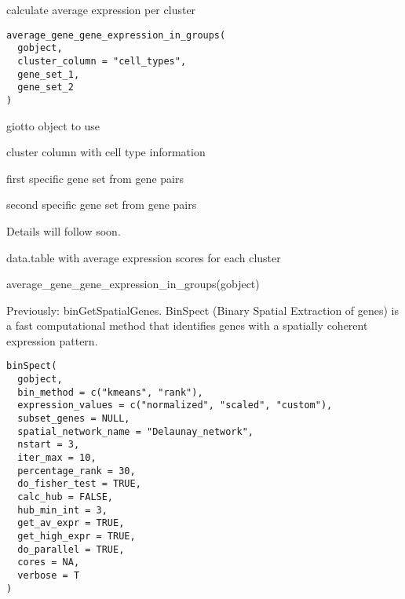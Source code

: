 \documentclass[a4paper]{book}
\begin{document}
%
\begin{Description}\relax
calculate average expression per cluster
\end{Description}
%
\begin{Usage}
\begin{verbatim}
average_gene_gene_expression_in_groups(
  gobject,
  cluster_column = "cell_types",
  gene_set_1,
  gene_set_2
)
\end{verbatim}
\end{Usage}
%
\begin{Arguments}
\begin{ldescription}
\item[\code{gobject}] giotto object to use

\item[\code{cluster\_column}] cluster column with cell type information

\item[\code{gene\_set\_1}] first specific gene set from gene pairs

\item[\code{gene\_set\_2}] second specific gene set from gene pairs
\end{ldescription}
\end{Arguments}
%
\begin{Details}\relax
Details will follow soon.
\end{Details}
%
\begin{Value}
data.table with average expression scores for each cluster
\end{Value}
%
\begin{Examples}
\begin{ExampleCode}
    average_gene_gene_expression_in_groups(gobject)
\end{ExampleCode}
\end{Examples}
%
\begin{Description}\relax
Previously: binGetSpatialGenes. BinSpect (Binary Spatial Extraction of genes) is a fast computational method
that identifies genes with a spatially coherent expression pattern.
\end{Description}
%
\begin{Usage}
\begin{verbatim}
binSpect(
  gobject,
  bin_method = c("kmeans", "rank"),
  expression_values = c("normalized", "scaled", "custom"),
  subset_genes = NULL,
  spatial_network_name = "Delaunay_network",
  nstart = 3,
  iter_max = 10,
  percentage_rank = 30,
  do_fisher_test = TRUE,
  calc_hub = FALSE,
  hub_min_int = 3,
  get_av_expr = TRUE,
  get_high_expr = TRUE,
  do_parallel = TRUE,
  cores = NA,
  verbose = T
)
\end{verbatim}
\end{Usage}
\end{document}
